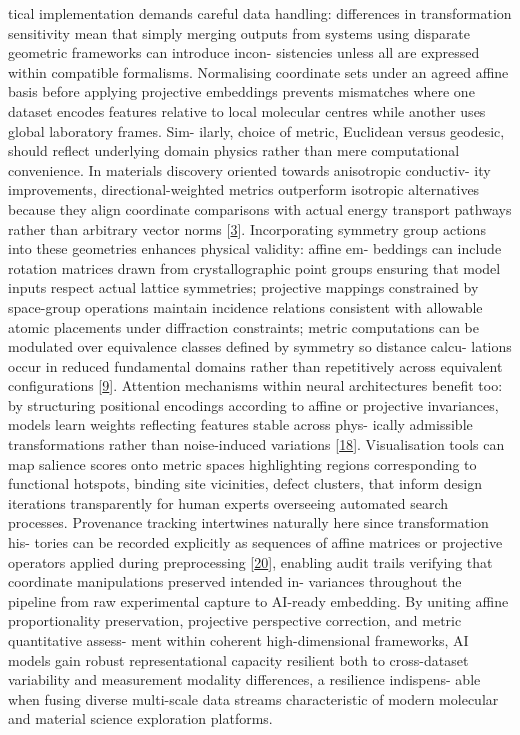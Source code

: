 \documentclass[
]{article}
\begin{document}
tical implementation demands careful data handling: differences in
transformation sensitivity mean that simply merging outputs from systems
using disparate geometric frameworks can introduce incon- sistencies
unless all are expressed within compatible formalisms. Normalising
coordinate sets under an agreed affine basis before applying projective
embeddings prevents mismatches where one dataset encodes features
relative to local molecular centres while another uses global laboratory
frames. Sim- ilarly, choice of metric, Euclidean versus geodesic, should
reflect underlying domain physics rather than mere computational
convenience. In materials discovery oriented towards anisotropic
conductiv- ity improvements, directional-weighted metrics outperform
isotropic alternatives because they align coordinate comparisons with
actual energy transport pathways rather than arbitrary vector norms
{[}\protect\hyperlink{_bookmark43}{3}{]}. Incorporating symmetry group
actions into these geometries enhances physical validity: affine em-
beddings can include rotation matrices drawn from crystallographic point
groups ensuring that model inputs respect actual lattice symmetries;
projective mappings constrained by space-group operations maintain
incidence relations consistent with allowable atomic placements under
diffraction constraints; metric computations can be modulated over
equivalence classes defined by symmetry so distance calcu- lations occur
in reduced fundamental domains rather than repetitively across
equivalent configurations {[}\protect\hyperlink{_bookmark49}{9}{]}.
Attention mechanisms within neural architectures benefit too: by
structuring positional encodings according to affine or projective
invariances, models learn weights reflecting features stable across
phys- ically admissible transformations rather than noise-induced
variations {[}\protect\hyperlink{_bookmark58}{18}{]}. Visualisation
tools can map salience scores onto metric spaces highlighting regions
corresponding to functional hotspots, binding site vicinities, defect
clusters, that inform design iterations transparently for human experts
overseeing automated search processes. Provenance tracking intertwines
naturally here since transformation his- tories can be recorded
explicitly as sequences of affine matrices or projective operators
applied during preprocessing {[}\protect\hyperlink{_bookmark60}{20}{]},
enabling audit trails verifying that coordinate manipulations preserved
intended in- variances throughout the pipeline from raw experimental
capture to AI-ready embedding. By uniting affine proportionality
preservation, projective perspective correction, and metric quantitative
assess- ment within coherent high-dimensional frameworks, AI models gain
robust representational capacity resilient both to cross-dataset
variability and measurement modality differences, a resilience
indispens- able when fusing diverse multi-scale data streams
characteristic of modern molecular and material science exploration
platforms.
\end{document}
